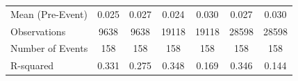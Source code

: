 {\begin{tabular}{l*{6}{c}}
\midrule
Mean (Pre-Event)&       0.025         &       0.027         &       0.024         &       0.030         &       0.027         &       0.030         \\
Observations&        9638         &        9638         &       19118         &       19118         &       28598         &       28598         \\
Number of Events&         158         &         158         &         158         &         158         &         158         &         158         \\
R-squared   &       0.331         &       0.275         &       0.348         &       0.169         &       0.346         &       0.144         \\
\bottomrule
\end{tabular}
}
